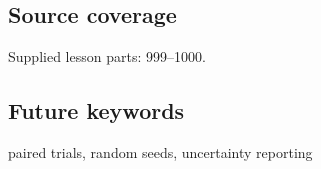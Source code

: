 \subsection{Source coverage}\label{appendix-b9db93e28371-source-coverage}

\hypertarget{appendix-b9db93e28371-source-coverage}{}

Supplied lesson parts: 999--1000.

\subsection{Future keywords}\label{appendix-b9db93e28371-future-keywords}

\hypertarget{appendix-b9db93e28371-future-keywords}{}

paired trials, random seeds, uncertainty reporting
